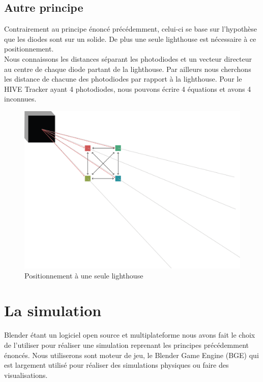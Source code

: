 \documentclass[10pt]{report}
\begin{document}
\subsection{Autre principe}

Contrairement au principe énoncé précédemment, celui-ci se base sur l'hypothèse que les diodes sont sur un solide. De plus une seule lighthouse est nécessaire à ce positionnement.\\

Nous connaissons les distances séparant les photodiodes et un vecteur directeur au centre de chaque diode partant de la lighthouse. Par ailleurs nous cherchons les distance de chacune des photodiodes par rapport à la lighthouse. Pour le HIVE Tracker ayant 4 photodiodes, nous pouvons écrire 4 équations et avons 4 inconnues.\\

\begin{figure}[h]
	\centering
	\includegraphics[scale=0.3]{one_LH.PNG}
	\caption{Positionnement à une seule lighthouse}
\end{figure}

\section{La simulation}

Blender étant un logiciel open source et multiplateforme nous avons fait le choix de l'utiliser pour réaliser une simulation reprenant les principes précédemment énoncés. Nous utiliserons sont moteur de jeu, le Blender Game Engine (BGE) qui est largement utilisé pour réaliser des simulations physiques ou faire des visualisations.\\
\end{document}
